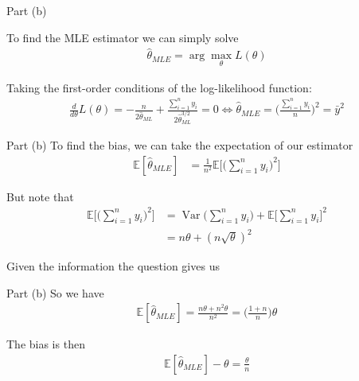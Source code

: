 \begin{frame}{Part (b)}

   To find the MLE estimator we can simply solve
   \begin{align*}
       \hat{\theta}_{MLE} = \arg \max_\theta L(\theta)
   \end{align*}

   Taking the first-order conditions of the log-likelihood function:
   \begin{align*}
        \frac{d}{d \theta} L(\theta) = - \frac{n}{2\hat{\theta}_{ML}} +  \frac{\sum_{i=1}^n y_i}{2\hat{\theta}_{ML}^{3/2}} = 0
        \iff \hat{\theta}_{MLE} = \Biggr( \frac{\sum_{i=1}^n y_i}{n} \Biggr)^2 = \bar{y}^2
    \end{align*}
   
\end{frame}

\begin{frame}{Part (b)}
    To find the bias, we can take the expectation of our estimator
    \begin{align*}
        \mathbb{E} [\hat{\theta}_{MLE}] &= \frac{1}{n^2} \mathbb{E} \Biggr[ \Biggr(\sum_{i=1}^n y_i\Biggr)^2 \Biggr]
    \end{align*}

    But note that
    \begin{align*}
        \mathbb{E} \Biggr[ \Biggr(\sum_{i=1}^n y_i\Biggr)^2 \Biggr] &= \operatorname{Var}\Biggr( \sum_{i=1}^n y_i \Biggr) + \mathbb{E} \Biggr[  \sum_{i=1}^n y_i \Biggr]^2
        \\
        &= n \theta + (n \sqrt{\theta})^2
    \end{align*}

    Given the information the question gives us
\end{frame}

\begin{frame}{Part (b)}
    So we have
    \begin{align*}
        \mathbb{E} [\hat{\theta}_{MLE}] = \frac{n \theta + n^2 \theta}{n^2} = \Biggr( \frac{1 + n}{n} \Biggr) \theta
    \end{align*}

    The bias is then
    \begin{align*}
        \mathbb{E} [\hat{\theta}_{MLE}] - \theta = \frac{\theta}{n}
    \end{align*}
    
\end{frame}

